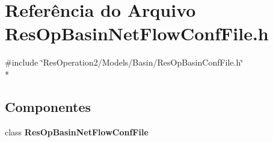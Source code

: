 \section{Referência do Arquivo Res\+Op\+Basin\+Net\+Flow\+Conf\+File.\+h}
\label{_res_op_basin_net_flow_conf_file_8h}
{\ttfamily \#include \char`\"{}Res\+Operation2/\+Models/\+Basin/\+Res\+Op\+Basin\+Conf\+File.\+h\char`\"{}}\\*
\subsection*{Componentes}
\begin{DoxyCompactItemize}
\item 
class {\bf Res\+Op\+Basin\+Net\+Flow\+Conf\+File}
\end{DoxyCompactItemize}
